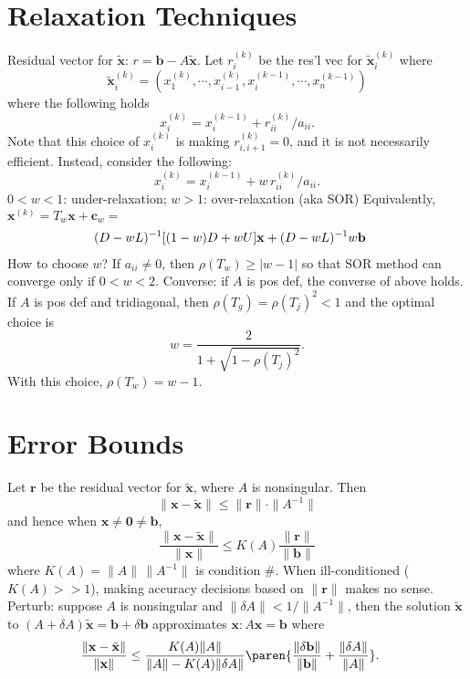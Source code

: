 \documentclass[b4paper,10pt]{memoir}
\begin{document}
\begin{multicols*}{3}
    \section{Relaxation Techniques}
    \s Residual vector for $\tilde {\mathbf x}$: $r = {\mathbf b} - A\tilde {\mathbf x}$. \nl
    \s Let $r_i^{(k)}$ be the res'l vec for $\tilde {\mathbf x}_i^{(k)}$ where
    \[ \tilde {\mathbf x}_i^{(k)} = (x_1^{(k)}, \cdots, x_{i-1}^{(k)},x_i^{(k-1)},\cdots, x_n^{(k-1)}) \]
    where the following holds
    \[ x_i^{(k)} = x_i^{(k-1)} + r_{ii}^{(k)}/ a_{ii} .\]
    Note that this choice of $x_i^{(k)}$ is making $r_{i,i+1}^{(k)}=0$, and it is not necessarily efficient. Instead, consider the following:
    \[ x_i^{(k)} = x_i^{(k-1)} + w\, r_{ii}^{(k)}/ a_{ii} .\]
    \s $0<w<1$: under-relaxation; \nl
    \s $w>1$: over-relaxation (aka SOR)\nl
    \s Equivalently, ${\mathbf x}^{(k)} =T_w\mathbf x + \mathbf c_w =$
    \begin{align*}
        \mkern-20mu (D-wL)^{-1}[(1-w)D + wU]{\mathbf x} + (D-wL)^{-1}w{\mathbf b}
    \end{align*}
    \s How to choose $w$?\nl
    \s If $a_{ii}\ne 0$, then $\rho(T_w)\ge |w-1|$ so that SOR method can converge only if $0<w<2$.\nl
    \s Converse: if $A$ is pos def, the converse of above holds.\nl
    \s If $A$ is pos def and tridiagonal, then $\rho(T_g) = \rho(T_j)^2 < 1$ and the optimal choice is
    \[ w = \frac{2}{1 + \sqrt{1-\rho(T_j)^2}}. \]
    With this choice, $\rho(T_w) = w-1$.

    \section{Error Bounds}
    \s Let $\mathbf r$ be the residual vector for $\tilde{\mathbf x}$, where $A$ is nonsingular. Then
    \[\|\mathbf x - \tilde{\mathbf x}\| \le \|\mathbf r\| \cdot \|A^{-1}\|\]
    and hence when $\mathbf x\ne \mathbf 0\ne \mathbf b$,
    \[ \frac{\|\mathbf x - \tilde{\mathbf x}\|}{\|\mathbf x\|} \le K(A) \frac{\|\mathbf r\|}{\|\mathbf b\|}\]
    where $K(A) = \|A\|\,\|A^{-1}\|$ is condition \#. When ill-conditioned ($K(A) >\!\!> 1$), making accuracy decisions based on $\|\mathbf r\|$ makes no sense. \nl
    \s Perturb: suppose $A$ is nonsingular and $\|\delta A\| < 1/\|A^{-1}\|$, then the solution $\tilde{\mathbf x}$ to $(A + \delta A)\tilde {\mathbf x} = \mathbf b + \delta\mathbf b$ approximates $\mathbf x:A\mathbf x = \mathbf b$ where
    \[\mkern-20mu  \frac{\|\mathbf x - \tilde{\mathbf x}\|}{\|\mathbf x\|} \le \frac{K(A)\|A\|}{\|A\|-K(A)\|\delta A\|} \paren{\frac{\|\delta\mathbf b\|}{\|\mathbf b\|} + \frac{\|\delta A\|}{\|A\|}}. \]


\end{multicols*}
\end{document}
